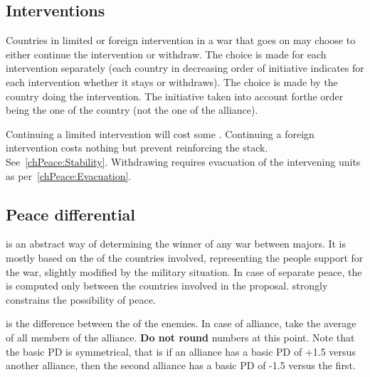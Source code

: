 
\subsection{Interventions}
\aparag Countries in limited or foreign intervention in a war that goes on may
choose to either continue the intervention or withdraw.
\bparag The choice is made for each intervention separately (each country in
decreasing order of initiative indicates for each intervention whether it
stays or withdraws).
\bparag The choice is made by the country doing the intervention. The
initiative taken into account forthe order being the one of the country (not
the one of the alliance).

\aparag Continuing a limited intervention will cost some \STAB. Continuing a
foreign intervention costs nothing but prevent reinforcing the
stack. See~\ref{chPeace:Stability}.
\bparag Withdrawing requires evacuation of the intervening units as
per~\ref{chPeace:Evacuation}.

\subsection{Peace differential}
 is an abstract way of determining the
winner of any war between majors. It is mostly based on the \STAB of the
countries involved, representing the people support for the war, slightly
modified by the military situation.
\bparag In case of separate peace, the  is computed
only between the countries involved in the proposal.
\bparag {} strongly constrains the possibility of
peace.

 is the difference between the \STAB of
the enemies.
\bparag In case of alliance, take the average \STAB of all members of the
alliance. \textbf{Do not round} numbers at this point.
\bparag Note that the basic PD is symmetrical, that is if an alliance has a
basic PD of +1.5 versus another alliance, then the second alliance has a basic
PD of -1.5 versus the first.

